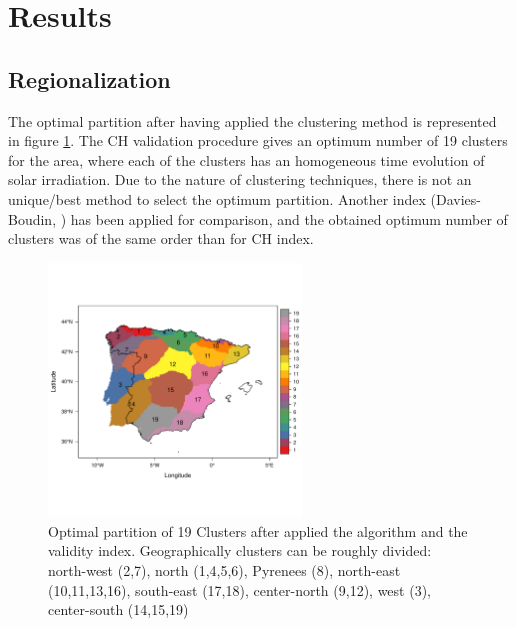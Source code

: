  

\section{Results}

\subsection{Regionalization}

The optimal partition after having applied the clustering method is represented in figure \ref{clusters}. The CH validation procedure gives an optimum number of 19 clusters for the area, where each of the clusters has an homogeneous time evolution of solar irradiation. Due to the nature of clustering techniques, there is not an unique/best method to select the optimum partition. Another index (Davies-Boudin, \cite{davies1979cluster}) has been applied for comparison, and the obtained optimum number of clusters was of the same order than for CH index.
 
\begin{figure}[h!]
\centering\includegraphics[width=0.6\textwidth]{figs/capitulo5/clusters2}
\caption{Optimal partition of 19 Clusters after applied the algorithm and the validity index. Geographically clusters can be roughly divided: north-west (2,7), north (1,4,5,6), Pyrenees (8), north-east (10,11,13,16), south-east (17,18), center-north (9,12), west (3), center-south (14,15,19)}
\label{clusters}
\end{figure}

